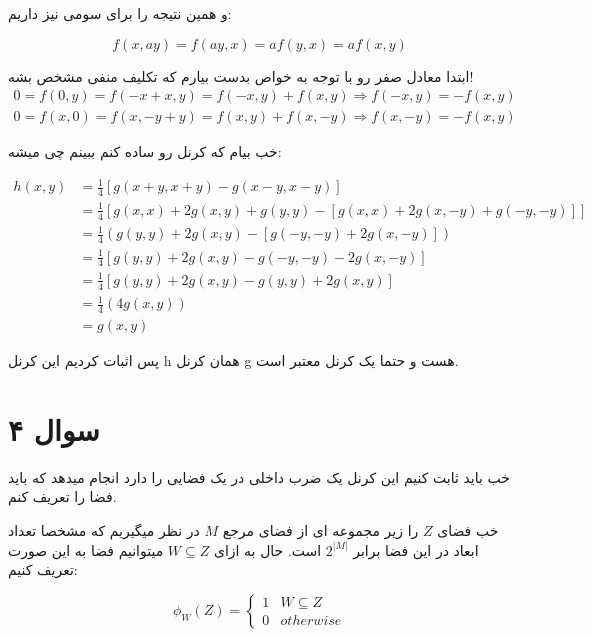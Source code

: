 \documentclass{article}[12pt]
\begin{document}
و همین نتیجه را برای سومی نیز داریم:

\begin{equation}
f(x,ay) = f(ay,x) = af(y,x) = af(x,y)
\end{equation}

ابتدا معادل صفر رو با توجه به خواص بدست بیارم که تکلیف منفی مشخص بشه! 
\begin{gather}
0 = f(0,y) = f(-x+x,y) = f(-x,y)+f(x,y)\Rightarrow f(-x,y) = -f(x,y)\\
0 = f(x,0) = f(x,-y+y) = f(x,y) + f(x,-y)
\Rightarrow f(x,-y) = -f(x,y) 
\end{gather}

خب بیام که کرنل رو ساده کنم ببینم چی میشه:

\begin{equation}
\begin{split}
h(x,y) &= \frac{1}{4} \left[
g(x+y,x+y) - g(x-y,x-y)
\right] 
\\&=  
\frac{1}{4} 
\left[
g(x,x) + 2g(x,y) + g(y,y) - 
\left[
g(x,x) + 2g(x,-y) + g(-y,-y)
\right] 
\right] 
\\&=
\frac{1}{4} \left(
 g(y,y)+ 2g(x,y) - \left[ g(-y,-y) + 2g(x,-y) \right] 
\right)\\
&= \frac{1}{4} \left[
g(y,y) + 2g(x,y) - g(-y,-y) - 2g(x,-y)
\right]
\\
&= \frac{1}{4} \left[
g(y,y) + 2g(x,y) - g(y,y) + 2g(x,y)
\right] \\
&= \frac{1}{4} (4g(x,y)) \\
&= g(x,y)
\end{split}
\end{equation}


پس اثبات کردیم این کرنل h 
همان کرنل g هست و حتما یک کرنل معتبر است. 

\clearpage
\section{سوال ۴}
خب باید ثابت کنیم این کرنل یک ضرب داخلی در یک فضایی را دارد انجام میدهد که باید فضا را تعریف کنم.

خب فضای 
$Z$
را زیر مجموعه ای از فضای مرجع 
$M$
در نظر میگیریم که مشخصا تعداد ابعاد در این فضا برابر 
$2^{|M|}$
است. حال به ازای  
$W \subseteq Z$
میتوانیم فضا به این صورت تعریف کنیم:

\begin{equation*}
\phi_W(Z) = \begin{cases}
1 & W\subseteq Z \\
0 & otherwise
\end{cases}
\end{equation*}
\end{document}
